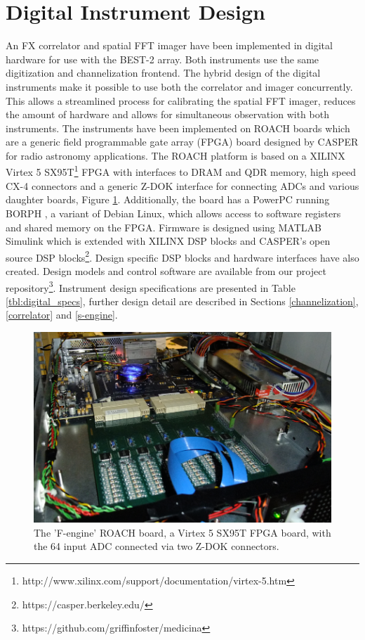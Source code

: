 \documentclass[useAMS,macros,usenatbib]{mn2e}
\begin{document}
\section{Digital Instrument Design}
\label{instrument design}

 An FX correlator and spatial FFT imager have been implemented in digital hardware for use with the BEST-2 array.
 Both instruments use the same digitization and channelization frontend.
 The hybrid design of the digital instruments make it possible to use both the correlator and imager concurrently.
 This allows a streamlined process for calibrating the spatial FFT imager, reduces the amount of hardware and allows for simultaneous observation with both instruments.
 The instruments have been implemented on ROACH boards which are a generic field programmable gate array (FPGA) board designed by CASPER for radio astronomy applications.
 The ROACH platform is based on a XILINX Virtex 5 SX95T\footnote{http://www.xilinx.com/support/documentation/virtex-5.htm} FPGA with interfaces to DRAM and QDR memory, high speed CX-4 connectors and a generic Z-DOK interface for connecting ADCs and various daughter boards, Figure \ref{fig:roach}.
 Additionally, the board has a PowerPC running BORPH \citep{borph}, a variant of Debian Linux, which allows access to software registers and shared memory on the FPGA.
 Firmware is designed using MATLAB Simulink which is extended with XILINX DSP blocks and CASPER's open source DSP blocks\footnote{https://casper.berkeley.edu/}.
 Design specific DSP blocks and hardware interfaces have also created.
 Design models and control software are available from our project repository\footnote{https://github.com/griffinfoster/medicina}.
 Instrument design specifications are presented in Table \ref{tbl:digital_specs}, further design detail are described in Sections \ref{channelization}, \ref{correlator} and \ref{s-engine}.

\begin{figure}
    \centering
    \includegraphics[width=\linewidth]{graphics/roach_feng.png}
    \caption{The 'F-engine' ROACH board, a Virtex 5 SX95T FPGA board, with the 64 input ADC connected via two Z-DOK connectors.}
    \label{fig:roach}
\end{figure}
\end{document}
